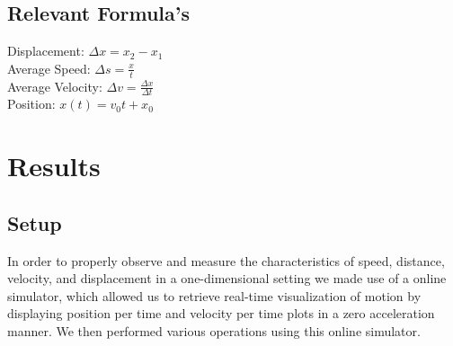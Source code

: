 \documentclass{article}
\begin{document}
\subsection{Relevant Formula's}
Displacement: \(\Delta x = x_2-x_1\) \\
Average Speed: \(\Delta s = \frac{x}{t}\) \\ 
Average Velocity: \(\Delta v = \frac{\Delta x} {\Delta t}\) \\ 
Position: \(x(t) = v_0t + x_0\)

\section{Results}
\subsection{Setup} 
In order to properly observe and measure the characteristics of speed, distance, velocity, and displacement in a one-dimensional setting we made use of a online simulator, which allowed us to retrieve real-time visualization of motion by displaying position per time and velocity per time plots in a zero acceleration manner. We then performed various operations using this online simulator. 
\end{document}

